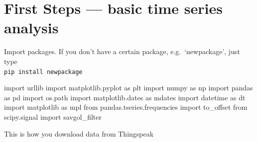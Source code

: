 \documentclass[
  letterpaper,
  DIV=11,
  numbers=noendperiod,
  oneside]{scrreprt}
\newenvironment{Shaded}{\begin{snugshade}}{\end{snugshade}}
\newcommand{\ImportTok}[1]{\textcolor[rgb]{0.00,0.46,0.62}{#1}}
\newcommand{\NormalTok}[1]{\textcolor[rgb]{0.00,0.23,0.31}{#1}}
\begin{document}
\hypertarget{first-steps-basic-time-series-analysis}{%
\chapter{First Steps --- basic time series
analysis}\label{first-steps-basic-time-series-analysis}}

Import packages. If you don't have a certain package, e.g.~`newpackage',
just type\\
\texttt{pip\ install\ newpackage}

\begin{Shaded}
\begin{Highlighting}[]
\ImportTok{import}\NormalTok{ urllib}
\ImportTok{import}\NormalTok{ matplotlib.pyplot }\ImportTok{as}\NormalTok{ plt}
\ImportTok{import}\NormalTok{ numpy }\ImportTok{as}\NormalTok{ np}
\ImportTok{import}\NormalTok{ pandas }\ImportTok{as}\NormalTok{ pd}
\ImportTok{import}\NormalTok{ os.path}
\ImportTok{import}\NormalTok{ matplotlib.dates }\ImportTok{as}\NormalTok{ mdates}
\ImportTok{import}\NormalTok{ datetime }\ImportTok{as}\NormalTok{ dt}
\ImportTok{import}\NormalTok{ matplotlib }\ImportTok{as}\NormalTok{ mpl}
\ImportTok{from}\NormalTok{ pandas.tseries.frequencies }\ImportTok{import}\NormalTok{ to\_offset}
\ImportTok{from}\NormalTok{ scipy.signal }\ImportTok{import}\NormalTok{ savgol\_filter}
\end{Highlighting}
\end{Shaded}

This is how you download data from Thingspeak
\end{document}
